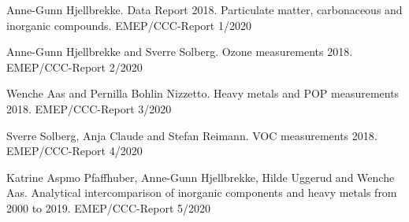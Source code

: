 






\enlargethispage{\baselineskip}
\begin{list}{}{\setlength{\leftmargin}{15pt}\setlength{\itemindent}{-\leftmargin}}\small
\item[]
Anne-Gunn Hjellbrekke. 
Data Report 2018. Particulate matter, carbonaceous and inorganic compounds.
EMEP/CCC-Report 1/2020

\item[]
Anne-Gunn Hjellbrekke and Sverre Solberg. 
Ozone measurements 2018. 
EMEP/CCC-Report 2/2020

\item[]
Wenche Aas and Pernilla Bohlin Nizzetto. 
Heavy metals and POP measurements 2018.
EMEP/CCC-Report 3/2020

\item[]
Sverre Solberg, Anja Claude and Stefan Reimann. 
VOC measurements 2018. 
EMEP/CCC-Report 4/2020

\item[]
Katrine Aspmo Pfaffhuber, Anne-Gunn Hjellbrekke, Hilde Uggerud  and Wenche Aas. 
Analytical intercomparison of inorganic components and heavy metals from 2000 to 2019.
EMEP/CCC-Report 5/2020
\end{list}



